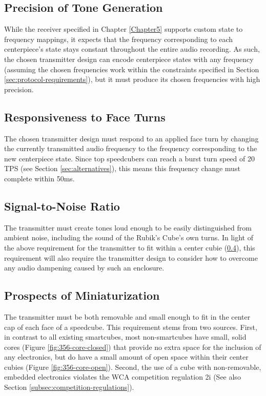 \subsection{Precision of Tone Generation}
\label{subsec:precision-of-tone-generation}

While the receiver specified in Chapter \ref{Chapter5} supports custom
state to frequency mappings, it expects that the frequency
corresponding to each centerpiece's state stays constant throughout the
entire audio recording. As such, the chosen transmitter design can
encode centerpiece states with any frequency (assuming the chosen
frequencies work within the constraints specified in Section
\ref{sec:protocol-requirements}), but it must produce its chosen
frequencies with high precision.

\subsection{Responsiveness to Face Turns}
\label{subsec:responsiveness-to-face-turns}

The chosen transmitter design must respond to an applied face turn by
changing the currently transmitted audio frequency to the frequency
corresponding to the new centerpiece state. Since top speedcubers can
reach a burst turn speed of 20 TPS (see Section
\ref{sec:alternatives}), this means this frequency change must complete
within 50ms.

\subsection{Signal-to-Noise Ratio}
\label{subsec:transmitter-signal-to-noise-ratio}

The transmitter must create tones loud enough to be easily
distinguished from ambient noise, including the sound of the Rubik's
Cube's own turns. In light of the above requirement for the transmitter
to fit within a center cubie
(\ref{subsec:prospects-of-miniaturization}), this requirement will also
require the transmitter design to consider how to overcome any audio
dampening caused by such an enclosure.

\subsection{Prospects of Miniaturization}
\label{subsec:prospects-of-miniaturization}

The transmitter must be both removable and small enough to fit in the
center cap of each face of a speedcube. This requirement stems from two
sources. First, in contrast to all existing smartcubes, most
non-smartcubes have small, solid cores (Figure
\ref{fig:356-core-closed}) that provide no extra space for the
inclusion of any electronics, but do have a small amount of open space
within their center cubies (Figure \ref{fig:356-core-open}). Second,
the use of a cube with non-removable, embedded electronics violates the
WCA competition regulation 2i \cite{wca-regulations} (See also Section
\ref{subsec:competition-regulations}).

